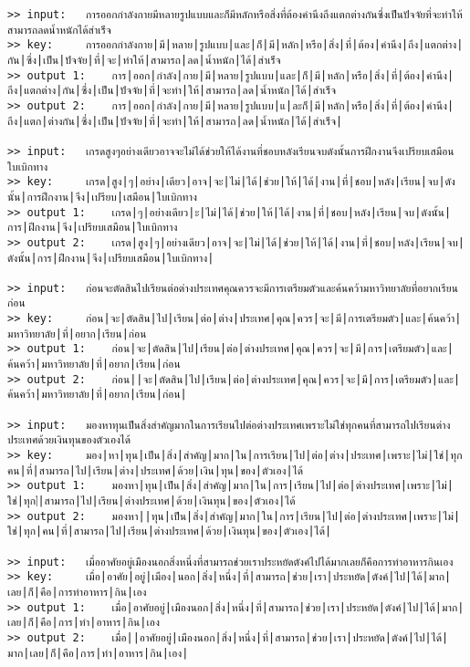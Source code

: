 \documentclass[11pt]{article}
\begin{document}
\begin{Verbatim}[commandchars=\\\{\}]
>> input:	การออกกำลังกายมีหลายรูปแบบและก็มีหลักหรือสิ่งที่ต้องคำนึงถึงแตกต่างกันซึ่งเป็นปัจจัยที่จะทำให้สามารถลดน้ำหนักได้สำเร็จ
>> key:		การออกกำลังกาย|มี|หลาย|รูปแบบ|และ|ก็|มี|หลัก|หรือ|สิ่ง|ที่|ต้อง|คำนึง|ถึง|แตกต่าง|กัน|ซึ่ง|เป็น|ปัจจัย|ที่|จะ|ทำให้|สามารถ|ลด|น้ำหนัก|ได้|สำเร็จ
>> output 1:	การ|ออก|กำลัง|กาย|มี|หลาย|รูปแบบ|และ|ก็|มี|หลัก|หรือ|สิ่ง|ที่|ต้อง|คำนึง|ถึง|แตกต่าง|กัน|ซึ่ง|เป็น|ปัจจัย|ที่|จะทำ|ให้|สามารถ|ลด|น้ำหนัก|ได้|สำเร็จ
>> output 2:	การ|ออก|กำลัง|กาย|มี|หลาย|รูปแบบ|แ|ละก็|มี|หลัก|หรือ|สิ่ง|ที่|ต้อง|คำนึง|ถึง|แตก|ต่างกัน|ซึ่ง|เป็น|ปัจจัย|ที่|จะทำ|ให้|สามารถ|ลด|น้ำหนัก|ได้|สำเร็จ|

>> input:	เกรดสูงๆอย่างเดียวอาจจะไม่ได้ช่วยให้ได้งานที่ชอบหลังเรียนจบดังนั้นการฝึกงานจึงเปรียบเสมือนใบเบิกทาง
>> key:		เกรด|สูง|ๆ|อย่าง|เดียว|อาจ|จะ|ไม่|ได้|ช่วย|ให้|ได้|งาน|ที่|ชอบ|หลัง|เรียน|จบ|ดังนั้น|การฝึกงาน|จึง|เปรียบ|เสมือน|ใบเบิกทาง
>> output 1:	เกรด|ๆ|อย่างเดียว|ะ|ไม่|ได้|ช่วย|ให้|ได้|งาน|ที่|ชอบ|หลัง|เรียน|จบ|ดังนั้น|การ|ฝึกงาน|จึง|เปรียบเสมือน|ใบเบิกทาง
>> output 2:	เกรด|สูง|ๆ|อย่างเดียว|อาจ|จะ|ไม่|ได้|ช่วย|ให้|ได้|งาน|ที่|ชอบ|หลัง|เรียน|จบ|ดังนั้น|การ|ฝึกงาน|จึง|เปรียบเสมือน|ใบเบิกทาง|

>> input:	ก่อนจะตัดสินไปเรียนต่อต่างประเทศคุณควรจะมีการเตรียมตัวและค้นคว้ามหาวิทยาลัยที่อยากเรียนก่อน
>> key:		ก่อน|จะ|ตัดสิน|ไป|เรียน|ต่อ|ต่าง|ประเทศ|คุณ|ควร|จะ|มี|การเตรียมตัว|และ|ค้นคว้า|มหาวิทยาลัย|ที่|อยาก|เรียน|ก่อน
>> output 1:	ก่อน|จะ|ตัดสิน|ไป|เรียน|ต่อ|ต่างประเทศ|คุณ|ควร|จะ|มี|การ|เตรียมตัว|และ|ค้นคว้า|มหาวิทยาลัย|ที่|อยาก|เรียน|ก่อน
>> output 2:	ก่อน||จะ|ตัดสิน|ไป|เรียน|ต่อ|ต่างประเทศ|คุณ|ควร|จะ|มี|การ|เตรียมตัว|และ|ค้นคว้า|มหาวิทยาลัย|ที่|อยาก|เรียน|ก่อน|

>> input:	มองหาทุนเป็นสิ่งสำคัญมากในการเรียนไปต่อต่างประเทศเพราะไม่ใช่ทุกคนที่สามารถไปเรียนต่างประเทศด้วยเงินทุนของตัวเองได้
>> key:		มอง|หา|ทุน|เป็น|สิ่ง|สำคัญ|มาก|ใน|การเรียน|ไป|ต่อ|ต่าง|ประเทศ|เพราะ|ไม่|ใช่|ทุกคน|ที่|สามารถ|ไป|เรียน|ต่าง|ประเทศ|ด้วย|เงิน|ทุน|ของ|ตัวเอง|ได้
>> output 1:	มองหา|ทุน|เป็น|สิ่ง|สำคัญ|มาก|ใน|การ|เรียน|ไป|ต่อ|ต่างประเทศ|เพราะ|ไม่|ใช่|ทุก|่|สามารถ|ไป|เรียน|ต่างประเทศ|ด้วย|เงินทุน|ของ|ตัวเอง|ได้
>> output 2:	มองหา||ทุน|เป็น|สิ่ง|สำคัญ|มาก|ใน|การ|เรียน|ไป|ต่อ|ต่างประเทศ|เพราะ|ไม่|ใช่|ทุก|คน|ที่|สามารถ|ไป|เรียน|ต่างประเทศ|ด้วย|เงินทุน|ของ|ตัวเอง|ได้|

>> input:	เมื่ออาศัยอยู่เมืองนอกสิ่งหนึ่งที่สามารถช่วยเราประหยัดตังค์ไปได้มากเลยก็คือการทำอาหารกินเอง
>> key:		เมื่อ|อาศัย|อยู่|เมือง|นอก|สิ่ง|หนึ่ง|ที่|สามารถ|ช่วย|เรา|ประหยัด|ตังค์|ไป|ได้|มาก|เลย|ก็|คือ|การทำอาหาร|กิน|เอง
>> output 1:	เมื่อ|อาศัยอยู่|เมืองนอก|สิ่ง|หนึ่ง|ที่|สามารถ|ช่วย|เรา|ประหยัด|ตังค์|ไป|ได้|มาก|เลย|ก็|คือ|การ|ทำ|อาหาร|กิน|เอง
>> output 2:	เมื่อ||อาศัยอยู่|เมืองนอก|สิ่ง|หนึ่ง|ที่|สามารถ|ช่วย|เรา|ประหยัด|ตังค์|ไป|ได้|มาก|เลย|ก็|คือ|การ|ทำ|อาหาร|กิน|เอง|


\end{Verbatim}
\end{document}
